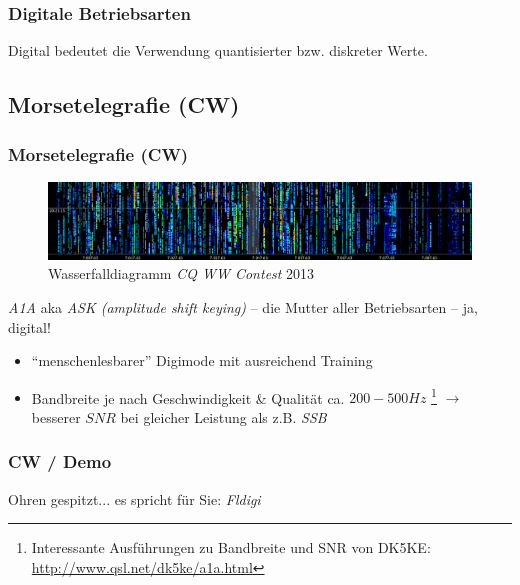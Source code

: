 \begin{frame}
  \frametitle{Digitale Betriebsarten}

  \centering Digital bedeutet die Verwendung quantisierter bzw. diskreter Werte.

\end{frame}

\subsection[CW]{Morsetelegrafie (CW)}

\begin{frame}
  \frametitle{Morsetelegrafie (CW)}

  \begin{center}
    \begin{figure}
      \includegraphics[width=1\textwidth,height=.5\textheight,keepaspectratio]{e16/CQWW_2013_CW_Waterfall.png}
      \caption{Wasserfalldiagramm \emph{CQ WW Contest} 2013}
    \end{figure}
  \end{center}

  \emph{A1A} aka \emph{ASK (amplitude shift keying)} -- die Mutter aller
  Betriebsarten -- ja, digital!

  \begin{itemize}
    \item ``menschenlesbarer'' Digimode mit ausreichend Training
    \item Bandbreite je nach Geschwindigkeit \& Qualität ca. $200-500 Hz$
      \footnote{Interessante Ausführungen zu Bandbreite und SNR von
      DK5KE: \url{http://www.qsl.net/dk5ke/a1a.html}}
      $\rightarrow$ besserer $SNR$ bei gleicher Leistung als z.B. \emph{SSB}
  \end{itemize}

\end{frame}

\begin{frame}
  \frametitle{CW / Demo}

  \Large{Ohren gespitzt... es spricht für Sie: \emph{Fldigi}}

\end{frame}

